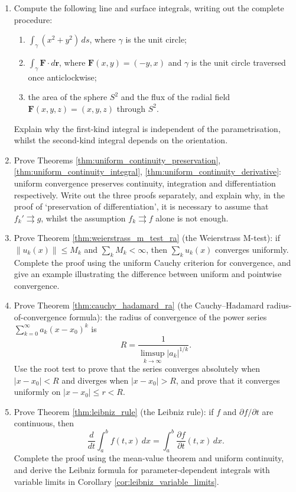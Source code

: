 \begin{enumerate}[leftmargin=3em, label=\textbf{Exercise \arabic*}]
    \item Compute the following line and surface integrals, writing out the complete procedure:
    \begin{enumerate}[label=(\roman*)]
        \item $\displaystyle\int_{\gamma}(x^2+y^2)\,ds$,
        where $\gamma$ is the unit circle;
        \item $\displaystyle\int_{\gamma}\mathbf{F}\cdot d\mathbf{r}$,
        where $\mathbf{F}(x,y)=(-y,x)$ and $\gamma$ is the unit circle traversed once anticlockwise;
        \item the area of the sphere $S^2$ and the flux of the radial field
        $\mathbf{F}(x,y,z)=(x,y,z)$ through $S^2$.
    \end{enumerate}
    Explain why the first-kind integral is independent of the parametrisation, whilst
    the second-kind integral depends on the orientation.

    \item Prove Theorems \ref{thm:uniform_continuity_preservation},
    \ref{thm:uniform_continuity_integral},
    \ref{thm:uniform_continuity_derivative}:
    uniform convergence preserves continuity, integration and differentiation respectively.
    Write out the three proofs separately,
    and explain why, in the proof of `preservation of differentiation',
    it is necessary to assume that $f_k'\rightrightarrows g$,
    whilst the assumption $f_k\rightrightarrows f$ alone is not enough.

    \item Prove Theorem \ref{thm:weierstrass_m_test_ra} (the Weierstrass M-test):
    if $\|u_k(x)\|\le M_k$ and $\sum_k M_k<\infty$,
    then $\sum_k u_k(x)$ converges uniformly.
    Complete the proof using the uniform Cauchy criterion for convergence,
    and give an example illustrating the difference between uniform and pointwise convergence.

    \item Prove Theorem \ref{thm:cauchy_hadamard_ra} (the Cauchy--Hadamard radius-of-convergence formula):
    the radius of convergence of the power series $\sum_{k=0}^\infty a_k(x-x_0)^k$ is
    \[
    R=\frac{1}{\limsup_{k\to\infty}|a_k|^{1/k}}.
    \]
    Use the root test to prove that the series converges absolutely when $|x-x_0|<R$ and
    diverges when $|x-x_0|>R$,
    and prove that it converges uniformly on $|x-x_0|\le r<R$.

    \item Prove Theorem \ref{thm:leibniz_rule} (the Leibniz rule):
    if $f$ and $\partial f/\partial t$ are continuous, then
    \[
    \frac{d}{dt}\int_a^b f(t,x)\,dx
    =
    \int_a^b\frac{\partial f}{\partial t}(t,x)\,dx.
    \]
    Complete the proof using the mean-value theorem and uniform continuity,
    and derive the Leibniz formula for parameter-dependent integrals with variable limits
    in Corollary \ref{cor:leibniz_variable_limits}.


\end{enumerate}
